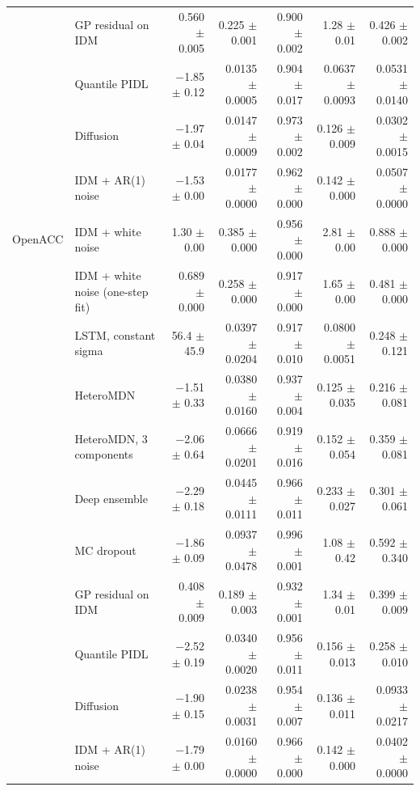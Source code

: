 \begin{longtable}{llrrrrr}
 & GP residual on IDM & 0.560 $\pm$ 0.005 & 0.225 $\pm$ 0.001 & 0.900 $\pm$ 0.002 & 1.28 $\pm$ 0.01 & 0.426 $\pm$ 0.002 \\
 & Quantile PIDL & $-$1.85 $\pm$ 0.12 & 0.0135 $\pm$ 0.0005 & 0.904 $\pm$ 0.017 & 0.0637 $\pm$ 0.0093 & 0.0531 $\pm$ 0.0140 \\
 & Diffusion & $-$1.97 $\pm$ 0.04 & 0.0147 $\pm$ 0.0009 & 0.973 $\pm$ 0.002 & 0.126 $\pm$ 0.009 & 0.0302 $\pm$ 0.0015 \\
 & IDM + AR(1) noise & $-$1.53 $\pm$ 0.00 & 0.0177 $\pm$ 0.0000 & 0.962 $\pm$ 0.000 & 0.142 $\pm$ 0.000 & 0.0507 $\pm$ 0.0000 \\
\midrule
OpenACC & IDM + white noise & 1.30 $\pm$ 0.00 & 0.385 $\pm$ 0.000 & 0.956 $\pm$ 0.000 & 2.81 $\pm$ 0.00 & 0.888 $\pm$ 0.000 \\
 & IDM + white noise (one-step fit) & 0.689 $\pm$ 0.000 & 0.258 $\pm$ 0.000 & 0.917 $\pm$ 0.000 & 1.65 $\pm$ 0.00 & 0.481 $\pm$ 0.000 \\
 & LSTM, constant sigma & 56.4 $\pm$ 45.9 & 0.0397 $\pm$ 0.0204 & 0.917 $\pm$ 0.010 & 0.0800 $\pm$ 0.0051 & 0.248 $\pm$ 0.121 \\
 & HeteroMDN & $-$1.51 $\pm$ 0.33 & 0.0380 $\pm$ 0.0160 & 0.937 $\pm$ 0.004 & 0.125 $\pm$ 0.035 & 0.216 $\pm$ 0.081 \\
 & HeteroMDN, 3 components & $-$2.06 $\pm$ 0.64 & 0.0666 $\pm$ 0.0201 & 0.919 $\pm$ 0.016 & 0.152 $\pm$ 0.054 & 0.359 $\pm$ 0.081 \\
 & Deep ensemble & $-$2.29 $\pm$ 0.18 & 0.0445 $\pm$ 0.0111 & 0.966 $\pm$ 0.011 & 0.233 $\pm$ 0.027 & 0.301 $\pm$ 0.061 \\
 & MC dropout & $-$1.86 $\pm$ 0.09 & 0.0937 $\pm$ 0.0478 & 0.996 $\pm$ 0.001 & 1.08 $\pm$ 0.42 & 0.592 $\pm$ 0.340 \\
 & GP residual on IDM & 0.408 $\pm$ 0.009 & 0.189 $\pm$ 0.003 & 0.932 $\pm$ 0.001 & 1.34 $\pm$ 0.01 & 0.399 $\pm$ 0.009 \\
 & Quantile PIDL & $-$2.52 $\pm$ 0.19 & 0.0340 $\pm$ 0.0020 & 0.956 $\pm$ 0.011 & 0.156 $\pm$ 0.013 & 0.258 $\pm$ 0.010 \\
 & Diffusion & $-$1.90 $\pm$ 0.15 & 0.0238 $\pm$ 0.0031 & 0.954 $\pm$ 0.007 & 0.136 $\pm$ 0.011 & 0.0933 $\pm$ 0.0217 \\
 & IDM + AR(1) noise & $-$1.79 $\pm$ 0.00 & 0.0160 $\pm$ 0.0000 & 0.966 $\pm$ 0.000 & 0.142 $\pm$ 0.000 & 0.0402 $\pm$ 0.0000 \\
\end{longtable}
\endgroup
